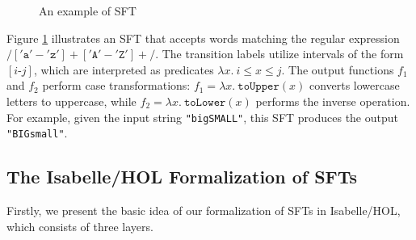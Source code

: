 \documentclass[sigplan,10pt,anonymous,review]{acmart}\settopmatter{printfolios=true,printccs=false,printacmref=false}
\begin{document}
\begin{figure}[hbt!]
  \centering
    \caption{An example of SFT}
    \label{fig-example-ft}
\end{figure}

    Figure \ref{fig-example-ft} illustrates an SFT that accepts words matching the regular expression $/['\texttt{a}'-'\texttt{z}']+['\texttt{A}'-'\texttt{Z}']+/$. The transition labels utilize intervals of the form $[i\text{-}j]$, which are interpreted as predicates $\lambda x.~i \leq x \leq j$. The output functions $f_1$ and $f_2$ perform case transformations: $f_1 = \lambda x.~\texttt{toUpper}(x)$ converts lowercase letters to uppercase, while $f_2 = \lambda x.~\texttt{toLower}(x)$ performs the inverse operation. For example, given the input string \texttt{"bigSMALL"}, this SFT produces the output \texttt{"BIGsmall"}.







\subsection{The Isabelle/HOL Formalization of SFTs}


Firstly, we present the basic idea of our formalization of SFTs in Isabelle/HOL, which consists of three layers.
\end{document}
